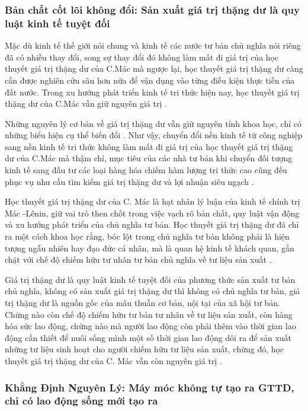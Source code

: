 \subsubsection{Bản chất cốt lõi không đổi: Sản xuất giá trị thặng dư là quy luật kinh tế tuyệt đối}

Mặc dù kinh tế thế giới nói chung và kinh tế các nước tư bản chủ nghĩa nói riêng đã có nhiều thay đổi, song sự thay đổi đó không làm mất đi giá trị của học thuyết giá trị thặng dư của C.Mác mà ngược lại, học thuyết giá trị thặng dư càng cần được nghiên cứu sâu hơn nữa để vận dụng vào từng điều kiện thực tiễn của đất nước. Trong xu hướng phát triển kinh tế tri thức hiện nay, học thuyết giá trị thặng dư của C.Mác vẫn giữ nguyên giá trị \cite{tapchi_congthuong_gttd}.

Những nguyên lý cơ bản về giá trị thặng dư vẫn giữ nguyên tính khoa học, chỉ có những biểu hiện cụ thể biến đổi \cite{do_the_tung_gttd}. Như vậy, chuyển đổi nền kinh tế từ công nghiệp sang nền kinh tế tri thức không làm mất đi giá trị của học thuyết giá trị thặng dư của C.Mác mà thậm chí, mục tiêu của các nhà tư bản khi chuyển đối tượng kinh tế sang đầu tư các loại hàng hóa chiếm hàm lượng tri thức cao cũng đều phục vụ nhu cầu tìm kiếm giá trị thặng dư và lợi nhuận siêu ngạch \cite{tapchi_congthuong_gttd}.

Học thuyết giá trị thặng dư của C. Mác là hạt nhân lý luận của kinh tế chính trị Mác -Lênin, giữ vai trò then chốt trong việc vạch rõ bản chất, quy luật vận động và xu hướng phát triển của chủ nghĩa tư bản. Học thuyết giá trị thặng dư đã chỉ ra một cách khoa học rằng, bóc lột trong chủ nghĩa tư bản không phải là hiện tượng ngẫu nhiên hay đạo đức cá nhân, mà là quan hệ kinh tế khách quan, gắn chặt với chế độ chiếm hữu tư nhân tư bản chủ nghĩa về tư liệu sản xuất \cite{tran_hieu_gttd}.

Giá trị thặng dư là quy luật kinh tế tuyệt đối của phương thức sản xuất tư bản chủ nghĩa, không có sản xuất giá trị thặng dư thì không có chủ nghĩa tư bản, giá trị thặng dư là nguồn gốc của mâu thuẫn cơ bản, nội tại của xã hội tư bản. Chừng nào còn chế độ chiếm hữu tư bản tư nhân về tư liệu sản xuất, còn hàng hóa sức lao động, chừng nào mà người lao động còn phải thêm vào thời gian lao động cần thiết để nuôi sống mình một số thời gian lao động dôi ra để sản xuất những tư liệu sinh hoạt cho người chiếm hữu tư liệu sản xuất, chừng đó, học thuyết giá trị thặng dư của C. Mác vẫn còn nguyên giá trị \cite{tran_hieu_gttd}.

\subsubsection{Khẳng Định Nguyên Lý: Máy móc không tự tạo ra GTTD, chỉ có lao động sống mới tạo ra}

